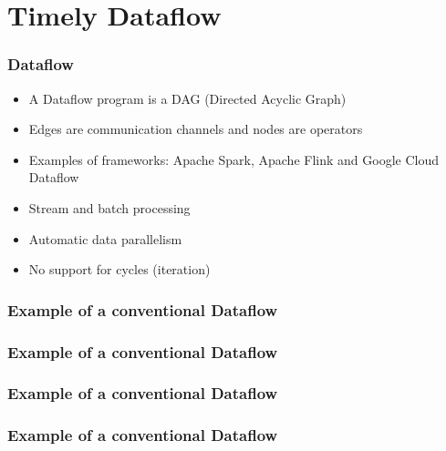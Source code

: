 \documentclass{beamer}
\begin{document}
\section{Timely Dataflow}

\begin{frame}
  \frametitle{Dataflow}
  \begin{itemize}
    \item A Dataflow program is a DAG (Directed Acyclic Graph)
          \pause
    \item Edges are communication channels and nodes are operators
          \pause
    \item Examples of frameworks: Apache Spark, Apache Flink and Google Cloud Dataflow
          \pause
    \item Stream and batch processing
          \pause
    \item Automatic data parallelism
          \pause
    \item No support for cycles (iteration)
  \end{itemize}
\end{frame}

\begin{frame}
  \frametitle{Example of a conventional Dataflow}
  \begin{center}
    
  \end{center}
\end{frame}

\begin{frame}
  \frametitle{Example of a conventional Dataflow}
  \begin{center}
    
  \end{center}
\end{frame}

\begin{frame}
  \frametitle{Example of a conventional Dataflow}
  \begin{center}
    
  \end{center}
\end{frame}

\begin{frame}
  \frametitle{Example of a conventional Dataflow}
  \begin{center}
    
  \end{center}
\end{frame}
\end{document}
